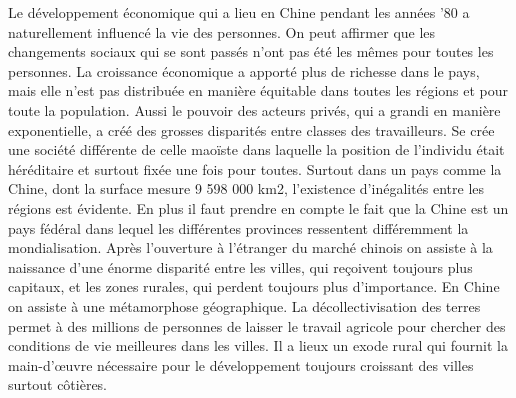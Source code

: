Le développement économique qui a lieu en Chine pendant les années ’80 a naturellement influencé la vie des personnes. On peut affirmer que les changements sociaux qui se sont passés n’ont pas été les mêmes pour toutes les personnes. La croissance économique a apporté plus de richesse dans le pays, mais elle n’est pas distribuée en manière équitable dans toutes les régions et pour toute la population.  Aussi le pouvoir des acteurs privés, qui a grandi en manière exponentielle, a créé des grosses disparités entre classes des travailleurs. Se crée une société différente de celle maoïste dans laquelle la position de l'individu était héréditaire et surtout fixée une fois pour toutes. 
Surtout dans un pays comme la Chine, dont la surface mesure 9 598 000 km2, l'existence d'inégalités entre les régions est évidente.   En plus il faut prendre en compte le fait que la Chine est un pays fédéral dans lequel les différentes provinces ressentent différemment la mondialisation.  Après l’ouverture à l’étranger du marché chinois on assiste à la naissance d’une énorme disparité entre les villes, qui reçoivent toujours plus capitaux, et les zones rurales, qui perdent toujours plus d’importance.  En Chine on assiste à une métamorphose géographique. La décollectivisation des terres permet à des millions de personnes de laisser le travail agricole pour chercher des conditions de vie meilleures dans les villes. Il a lieux un exode rural qui fournit la main-d’œuvre nécessaire pour le développement toujours croissant des villes surtout côtières. 

